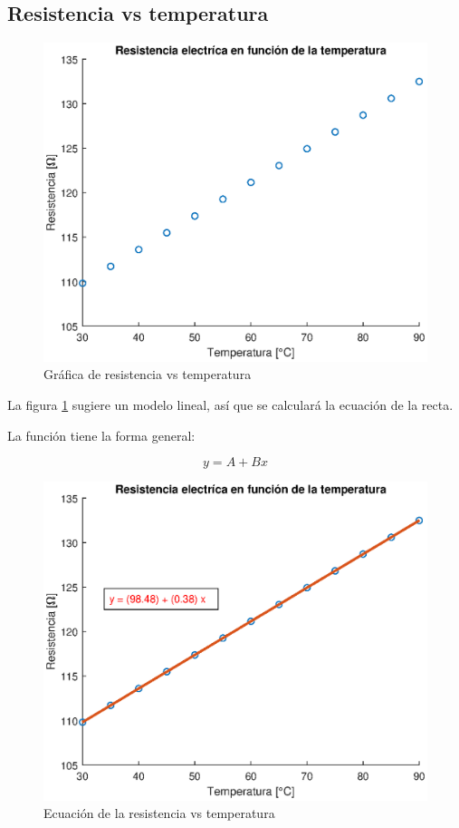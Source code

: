 \documentclass[letter,11pt]{article}
\begin{document}
\subsection{Resistencia vs temperatura}
\begin{figure}[!h]
\centering
\includegraphics[scale=1.00]{resources/3.3.1.eps}
\caption{Gráfica de resistencia vs temperatura}
\label{practica33}
\end{figure}

La figura \ref{practica33} sugiere un modelo lineal, así que se calculará la
ecuación de la recta.

La función tiene la forma general:

\begin{equation}
    y = A + B x
\end{equation}

\begin{figure}[!h]
\centering
\includegraphics[scale=1.00]{resources/3.3.2.eps}
\caption{Ecuación de la resistencia vs temperatura}
\label{practica33_2}
\end{figure}
\end{document}
